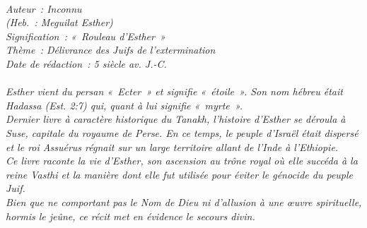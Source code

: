 \BFont
\noindent\hrulefill
{\footnotesize
\textit{
\bigskip
{\centering{}
\\Auteur~: Inconnu
\\(Heb.~: Meguilat Esther)
\\Signification~: «~Rouleau d'Esther~»
\\Thème~: Délivrance des Juifs de l'extermination
\\Date de rédaction~: 5 siècle av. J.-C.\\}
}
\textit{
\\Esther vient du persan «~Ecter~» et signifie «~étoile~». Son nom hébreu était Hadassa (Est. 2:7) qui, quant à lui signifie «~myrte~».
\\Dernier livre à caractère historique du Tanakh, l'histoire d'Esther se déroula à Suse, capitale du royaume de Perse. En ce temps, le peuple d'Israël était dispersé et le roi Assuérus régnait sur un large territoire allant de l'Inde à l'Ethiopie.
\\Ce livre raconte la vie d'Esther, son ascension au trône royal où elle succéda à la reine Vasthi et la manière dont elle fut utilisée pour éviter le génocide du peuple Juif. 
\\Bien que ne comportant pas le Nom de Dieu ni d'allusion à une œuvre spirituelle, hormis le jeûne, ce récit met en évidence le secours divin.\bigskip
}
}
\par\nobreak\noindent\hrulefill
